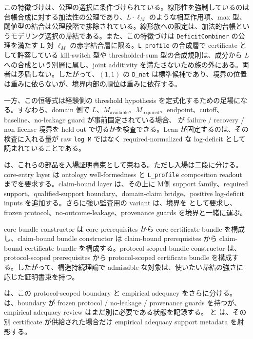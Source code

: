 \documentclass[12pt,a4paper]{article}
\begin{document}
この特徴づけは、公理の選択に条件づけられている。線形性を強制しているのは台帳合成に対する加法性の公理であり、\(L\cdot\ell_M\) のような相互作用項、max 型、閾値型の結合は公理段階で排除されている。線形族への限定は、加法的台帳というモデリング選択の帰結である。また、この特徴づけは \texttt{DeficitCombiner} の公理を満たす L 対 \(\ell_M\) の赤字結合層に限る。\texttt{L\_profile} の合成層で certificate として許容している kill-switch 型や thresholded-sum 型の合成規則は、成分から $L$ への合成という別層に属し、joint additivity を満たさないため族の外にある。両者は矛盾しない。したがって、\((1,1)\) の \texttt{D\_nat} は標準候補であり、境界の位置は重みに依らないが、境界内部の順位は重みに依存する。

一方、この恒等式は経験側の threshold hypothesis を定式化するための足場になる。すなわち、domain 側で \(L\)、\(M_{\mathrm{available}}\)、\(M_{\mathrm{required}}\)、endpoint、cutoff、baseline、no-leakage guard が事前固定されている場合、{\scriptsize{}} が failure / recovery / non-license 境界を held-out で切るかを検査できる。Lean が固定するのは、その検査に入れる量が raw \texttt{log\ M} ではなく required-normalized な log-deficit として読まれていることである。

{\scriptsize{}} は、これらの部品を入場証明書束として束ねる。ただし入場は二段に分ける。core-entry layer は ontology well-formedness と \texttt{L\_profile} composition readout までを要求する。claim-bound layer は、その上に M側 support family、required support、qualified-support boundary、domain-claim bridge、positive log-deficit inputs を追加する。さらに強い監査用の variant は、境界を {\scriptsize{}} として要求し、frozen protocol、no-outcome-leakage、provenance guards を境界と一緒に運ぶ。

core-bundle constructor は core prerequisites から core certificate bundle を構成し、claim-bound bundle constructor は claim-bound prerequisites から claim-bound certificate bundle を構成する。protocol-scoped bundle constructor は、protocol-scoped prerequisites から protocol-scoped certificate bundle を構成する。したがって、構造持続理論で admissible な対象は、使いたい帰結の強さに応じた証明書束を持つ。

{\scriptsize{}} は、この protocol-scoped boundary と empirical adequacy をさらに分ける。{\scriptsize{}} は、boundary が frozen protocol / no-leakage / provenance guards を持つが、empirical adequacy review はまだ別に必要である状態を記録する。{\scriptsize{}} と {\scriptsize{}} は、その別 certificate が供給された場合だけ empirical adequacy support metadata を射影する。
\end{document}
